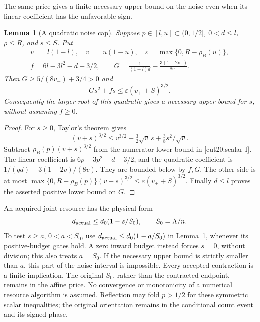 \documentclass[11pt,a4paper]{article}
\numberwithin{equation}{section}
\newtheorem{lemma}[theorem]{Lemma}
\theoremstyle{definition}
\theoremstyle{remark}
\begin{document}
The same price gives a finite necessary upper bound on the noise
even when its linear coefficient has the unfavorable sign.
\begin{lemma}[A quadratic noise cap]\label{cut20:quadratic-cap}
Suppose \(p\in[l,u]\subset(0,1/2]\), \(0<d\le l\),
\(\rho\le R\), and \(s\le S\). Put
\[
 \begin{gathered}
 v_-=l(1-l),\quad v_+=u(1-u),\quad
 \varepsilon=\max\{0,R-\rho_B(u)\},\\
 f=6l-3l^2-d-3/2,\qquad
 G=\frac1{(1-l)d}-\frac{3(1-2v_-)}{8v_-}.
 \end{gathered}
\]
Then \(G\ge5/(8v_-)+3/4>0\) and
\begin{equation}\label{cut20:quadratic-necessary}
 Gs^2+fs\le\varepsilon(v_++S)^{3/2}.
\end{equation}
Consequently the larger root of this quadratic gives a necessary
upper bound for \(s\), without assuming \(f\ge0\).
\end{lemma}
\begin{proof}
For \(s\ge0\), Taylor's theorem gives
\[
 (v+s)^{3/2}\le v^{3/2}+\tfrac32\sqrt v\,s
                       +\tfrac38s^2/\sqrt v.
\]
Subtract \(\rho_B(p)(v+s)^{3/2}\) from the numerator lower
bound in \eqref{cut20:scalar-I}. The linear coefficient is
\(6p-3p^2-d-3/2\), and the quadratic coefficient is
\(1/(qd)-3(1-2v)/(8v)\). They are bounded below by \(f,G\).
The other side is at most
\(\max\{0,R-\rho_B(p)\}(v+s)^{3/2}
 \le\varepsilon(v_++S)^{3/2}\).
Finally \(d\le l\) proves the asserted positive lower bound on \(G\).
\end{proof}

An acquired joint resource has the physical form
\[
 d_{\rm actual}\le d_0(1-s/S_0),\qquad S_0=\Lambda/n.
\]
To test \(s\ge a\), \(0<a<S_0\), use
\(d_{\rm actual}\le d_0(1-a/S_0)\) in
Lemma~\ref{cut20:quadratic-cap}, whenever its positive-budget
gates hold. A zero inward budget instead forces \(s=0\), without
division; this also treats \(a=S_0\). If the necessary upper bound is
strictly smaller than \(a\), this part of the noise interval is
impossible. Every accepted contraction is a finite implication.
The original \(S_0\), rather than the contracted endpoint, remains
in the affine price. No convergence or monotonicity of a numerical
resource algorithm is assumed. Reflection may fold \(p>1/2\) for
these symmetric scalar inequalities; the original orientation
remains in the conditional count event and its signed phase.
\end{document}
